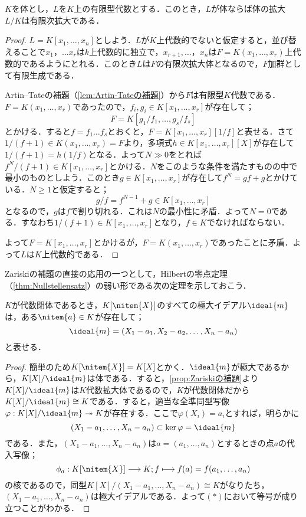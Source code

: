 \begin{prop}[Zariskiの補題]\label{prop:Zariskiの補題}
	$K$を体とし，$L$を$K$上の有限型代数とする．このとき，$L$が体ならば体の拡大$L/K$は有限次拡大である．
\end{prop}

\begin{proof}
	$L=K[x_1,\dots,x_n]$としよう．$L$が$K$上代数的でないと仮定すると，並び替えることで$x_1，\dots x_r$は$k$上代数的に独立で，$x_{r+1},\dots，x_n$は$F=K(x_1,\dots,x_r)$上代数的であるようにとれる．このとき$L$は$F$の有限次拡大体となるので，$F$加群として有限生成である．
	
	Artin--Tateの補題（\ref{lem:Artin-Tateの補題}）から$F$は有限型$K$代数である．$F=K(x_1,\dots,x_r)$であったので，$f_i,g_i\in K[x_1,\dots,x_r]$が存在して；
	\[F=K[g_1/f_1,\dots,g_s/f_s]\]
	とかける．すると$f=f_1\dots f_s$とおくと，$F=K[x_1,\dots,x_r][1/f]$と表せる．さて$1/(f+1)\in K(x_1,\dots,x_r)=F$より，多項式$h\in K[x_1,\dots,x_r][X]$が存在して$1/(f+1)=h(1/f)$となる．よって$N\gg0$をとれば$f^N/(f+1)\in K[x_1,\dots,x_r]$とかける．$N$をこのような条件を満たすものの中で最小のものとしよう．このとき$g\in K[x_1,\dots,x_r]$が存在して$f^N=gf+g$とかけている．$N\geq1$と仮定すると；
	\[g/f=f^{N-1}+g\in K[x_1,\dots,x_r]\]
	となるので，$g$は$f$で割り切れる．これは$N$の最小性に矛盾．よって$N=0$である．すなわち$1/(f+1)\in K[x_1,\dots,x_r]$となり，$f\in K$でなければならない．
	
	よって$F=K[x_1,\dots,x_r]$とかけるが，$F=K(x_1,\dots,x_r)$であったことに矛盾．よって$L$は$K$上代数的である．
\end{proof}

Zariskiの補題の直接の応用の一つとして，Hilbertの零点定理（\ref{thm:Nullstellensatz}）の弱い形である次の定理を示しておこう．

\begin{thm}\label{thm:week nullstellensatz}
	$K$が代数閉体であるとき，$K[\nitem{X}]$のすべての極大イデアル$\ideal{m}$は，ある$\nitem{a}\in K$が存在して；
	\[\ideal{m}=(X_1-a_1,X_2-a_2,\dots,X_n-a_n)\]
	と表せる．
\end{thm}
\begin{proof}
	簡単のため$K[\nitem{X}]=K[X]$とかく．$\ideal{m}$が極大であるから，$K[X]/\ideal{m}$は体である．すると，\ref{prop:Zariskiの補題}より$K[X]/\ideal{m}$は$K$代数拡大体であるので，$K$が代数閉体だから$K[X]/\ideal{m}\cong K$である．すると，適当な全準同型写像$\varphi:K[X]/\ideal{m}\twoheadrightarrow K$が存在する．ここで$\varphi(X_i)=a_i$とすれば，明らかに\displaystar
	\[(X_1-a_1,\dots,X_n-a_n)\subset\ker\varphi=\ideal{m}\]
	である．また，$(X_1-a_1,\dots,X_n-a_n)$は$a=(a_1,\dots,a_n)$とするときの点$a$の代入写像；
	\[\phi_a:K[\nitem{X}]\longrightarrow K;f\longmapsto f(a)=f(a_1,\dots,a_n)\]
	の核であるので，同型$K[X]/(X_1-a_1,\dots,X_n-a_n)\cong K$がなりたち，$(X_1-a_1,\dots,X_n-a_n)$は極大イデアルである．よって$(\ast)$において等号が成り立つことがわかる．
\end{proof}
